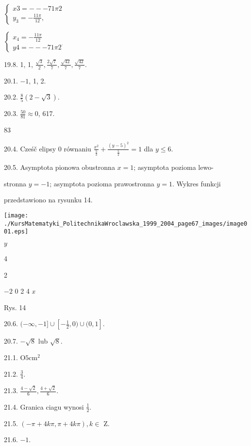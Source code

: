 \documentclass[a4paper,12pt]{article}
\begin{document}
$\left\{\begin{array}{l}
x3=--- 71\pi 2\\
y_{3}=-\frac{11\pi}{12},
\end{array}\right.$

$\left\{\begin{array}{l}
x_{4}=-\frac{11\pi}{12}\\
y4=--- 71\pi 2^{\cdot}
\end{array}\right.$

19.8. 1, 1, $\displaystyle \frac{\sqrt{3}}{2}, \displaystyle \frac{2\sqrt{7}}{7}, \displaystyle \frac{\sqrt{42}}{7}, \displaystyle \frac{\sqrt{42}}{7}.$

20.1. $-1$, 1, 2.

20.2. $\displaystyle \frac{8}{5}(2-\sqrt{3}).$

20.3. $\displaystyle \frac{50}{81}\approx 0$, 617.





83

20.4. Cześč elipsy $0$ równaniu $\displaystyle \frac{x^{2}}{\frac{5}{3}}+\frac{(y-5)^{2}}{\frac{5}{2}}=1$ dla $y\leq 6.$

20.5. Asymptota pionowa obustronna $x=1$; asymptota pozioma lewo-

stronna $y=-1$; asymptota pozioma prawostronna $y=1$. Wykres funkcji

przedstawiono na rysunku 14.
\begin{center}
\texttt{[image: ./KursMatematyki\_PolitechnikaWroclawska\_1999\_2004\_page67\_images/image001.eps]}
\end{center}
$y$

4

2

$-2$  0 2  4  {\it x}

Rys. 14

20.6. $(-\displaystyle \infty,-1]\cup[-\frac{1}{2},0)\cup(0,1].$

20.7. $-\sqrt{8}$ lub $\sqrt{8}.$

21.1. $\mathrm{O} 5\mathrm{c}\mathrm{m}^{2}$

21.2. $\displaystyle \frac{3}{4}.$

21.3. $\displaystyle \frac{4-\sqrt{2}}{6}, \displaystyle \frac{4+\sqrt{2}}{6}.$

21.4. Granica ciagu wynosi $\displaystyle \frac{1}{2}.$

21.5. $(-\pi+4k\pi,\pi+4k\pi),  k\in$ Z.

21.6. $-1.$
\end{document}
